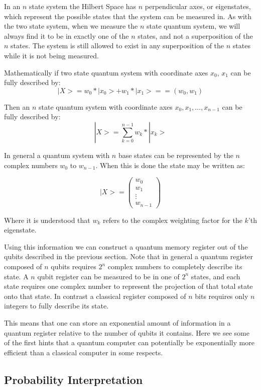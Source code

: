 \documentclass[]{article}
\begin{document}
In an $n$ state system the Hilbert Space has $n$ perpendicular axes,
or eigenstates, which represent the possible states that the system
can be measured in. As with the two state system, when we measure the
$n$ state quantum system, we will always find it to be in exactly one
of the $n$ states, and not a superposition of the $n$ states.  The
system is still allowed to exist in any superposition of the $n$
states while it is not being measured.

Mathematically if two state quantum system with coordinate axes
$x_{0}$, $x_{1}$ can be fully described by: \[|X> = w_{0} * |x_{0}> +
w_{1} * |x_{1}> == (w_{0},w_{1})\]

Then an $n$ state quantum system with coordinate axes $x_{0},
x_{1},\ldots, x_{n-1}$ can be fully described by: \[|X> = \sum_{k =
0}^{n-1} w_{k} * |x_{k}>\]

In general a quantum system with $n$ base states can be represented by
the $n$ complex numbers $w_{0}$ to $w_{n-1}$. When this is done the
state may be written as:
	
\[ |X> = \left( \begin{array}{c} 
		w_{0} \\ 
		w_{1} \\ 
		\vdots \\ 
		w_{n-1}
\end{array} \right) \]

Where it is understood that $w_{k}$ refers to the complex weighting
factor for the $k$'th eigenstate.

Using this information we can construct a quantum memory register out
of the qubits described in the previous section. Note that in general
a quantum register composed of $n$ qubits requires $2^{n}$ complex
numbers to completely describe its state.  A $n$ qubit register can be
measured to be in one of $2^{n}$ states, and each state requires one
complex number to represent the projection of that total state onto
that state. In contrast a classical register composed of $n$ bits
requires only $n$ integers to fully describe its state.

This means that one can store an exponential amount of information in
a quantum register relative to the number of qubits it contains. Here
we see some of the first hints that a quantum computer can potentially
be exponentially more efficient than a classical computer in some
respects.

\subsection{Probability Interpretation}
\end{document}
